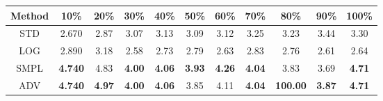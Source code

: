 \documentclass{standalone}
\begin{document}
\begin{tabular}{c|cccccccccc}
      \toprule
      Method & 10\% & 20\% & 30\% & 40\% & 50\% & 60\% & 70\% & 80\% & 90\% & 100\% \\
      \midrule
STD & 2.670 & 2.87 & 3.07 & 3.13 & 3.09 & 3.12 & 3.25 & 3.23 & 3.44 & 3.30\\
LOG & 2.890 & 3.18 & 2.58 & 2.73 & 2.79 & 2.63 & 2.83 & 2.76 & 2.61 & 2.64\\
SMPL & \textbf{4.740} & 4.83 & \textbf{4.00} & \textbf{4.06} & \textbf{3.93} & \textbf{4.26} & \textbf{4.04} & 3.83 & 3.69 & \textbf{4.71}\\
ADV & \textbf{4.740} & \textbf{4.97} & \textbf{4.00} & \textbf{4.06} & 3.85 & 4.11 & \textbf{4.04} & \textbf{100.00} & \textbf{3.87} & \textbf{4.71}\\
  \bottomrule
\end{tabular}
\end{document}
